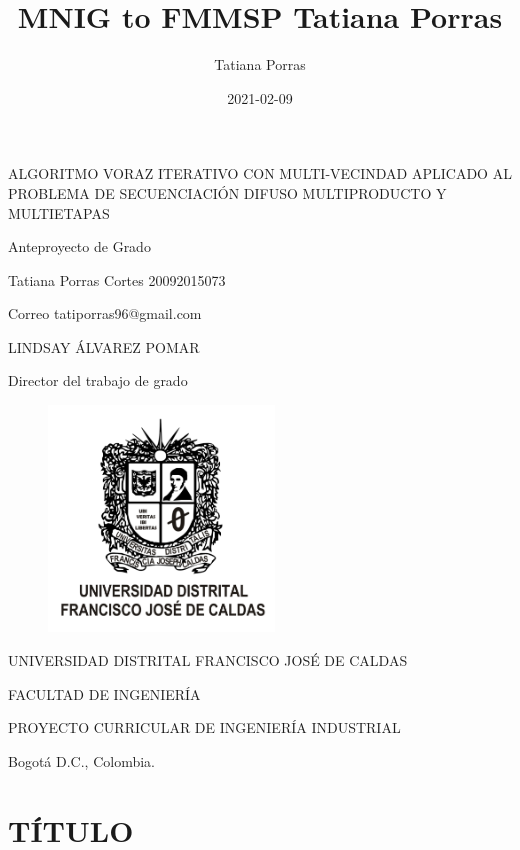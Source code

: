 \documentclass{article}
\title{MNIG to FMMSP Tatiana Porras}
\date{2021-02-09}
\author{Tatiana Porras}
\makeatletter
\let\dateVar\@date
\makeatother
\begin{document}
\begin{titlepage}
    \begin{center}
    ALGORITMO VORAZ ITERATIVO CON MULTI-VECINDAD APLICADO AL PROBLEMA DE SECUENCIACIÓN DIFUSO MULTIPRODUCTO Y MULTIETAPAS
    \par \bigskip
    Anteproyecto de Grado
    \par \vspace{5cm}
    Tatiana Porras Cortes \hspace{1cm} 20092015073
    \par \medskip
    Correo \hspace{1cm} tatiporras96@gmail.com
    \par \bigskip
    LINDSAY ÁLVAREZ POMAR \par Director del trabajo de grado
    \par \vspace{1cm}
    \begin{figure}[h!]
        \begin{center}
        \includegraphics[width=6cm]{EscudoUD1.png}
        \end{center}
    \end{figure}
    \par UNIVERSIDAD DISTRITAL FRANCISCO JOSÉ DE CALDAS
    \par FACULTAD DE INGENIERÍA
    \par PROYECTO CURRICULAR DE INGENIERÍA INDUSTRIAL
    \par Bogotá D.C., Colombia. \dateVar
    \end{center}
\end{titlepage}

\renewcommand{\contentsname}{Tabla de Contenido}

\tableofcontents

\setcounter{section}{-1}

\section{TÍTULO}
\end{document}
